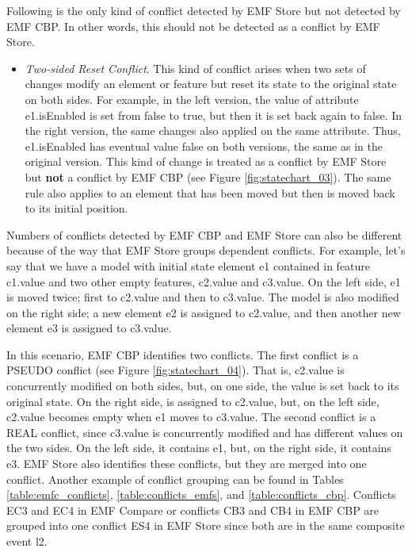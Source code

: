 Following is the only kind of conflict detected by EMF Store but not detected by EMF CBP. In other words, this should not be detected as a conflict by EMF Store.
\begin{itemize}
  \item \emph{Two-sided Reset Conflict}. This kind of conflict arises when two sets of changes modify an element or feature but reset its state to the original state on both sides. For example, in the left version, the value of attribute \textsf{e1}.\textsf{isEnabled} is set from \textsf{false} to \textsf{true}, but then it is set back again to \textsf{false}. In the right version, the same changes also applied on the same attribute. Thus, \textsf{e1}.\textsf{isEnabled} has eventual value \textsf{false} on both versions, the same as in the original version. This kind of change is treated as a conflict by EMF Store but \textbf{not} a conflict by EMF CBP (see Figure \ref{fig:statechart_03}). The same rule also applies to an element that has been moved but then is moved back to its initial position.
\end{itemize}

Numbers of conflicts detected by EMF CBP and EMF Store can also be different because of the way that EMF Store groups dependent conflicts. For example, let’s say that we have a model with initial state element \textsf{e1} contained in feature \textsf{c1}.\textsf{value} and two other empty features, \textsf{c2}.\textsf{value} and \textsf{c3}.\textsf{value}. On the left side, \textsf{e1} is moved twice; first to \textsf{c2}.\textsf{value} and then to \textsf{c3}.\textsf{value}. The model is also modified on the right side; a new element \textsf{e2} is assigned to \textsf{c2}.\textsf{value}, and then another new element \textsf{e3} is assigned to \textsf{c3}.\textsf{value}.

In this scenario, EMF CBP identifies two conflicts. The first conflict is a \textsf{PSEUDO} conflict (see Figure \ref{fig:statechart_04}). That is, \textsf{c2}.\textsf{value} is concurrently modified on both sides, but, on one side, the value is set back to its original state. On the right side,  is assigned to \textsf{c2}.\textsf{value}, but, on the left side, \textsf{c2}.\textsf{value} becomes empty when \textsf{e1} moves to \textsf{c3}.\textsf{value}. The second conflict is a \textsf{REAL} conflict, since \textsf{c3}.\textsf{value} is concurrently modified and has different values on the two sides. On the left side, it contains \textsf{e1}, but, on the right side, it contains \textsf{e3}. EMF Store also identifies these conflicts, but they are merged into one conflict. Another example of conflict grouping can be found in Tables \ref{table:emfc_conflicts}, \ref{table:conflicts_emfs}, and \ref{table:conflicts_cbp}. Conflicts \textsf{EC3} and \textsf{EC4} in EMF Compare or conflicts \textsf{CB3} and \textsf{CB4} in EMF CBP are grouped into one conflict \textsf{ES4} in EMF Store since both are in the same composite event \textsf{l2}.


